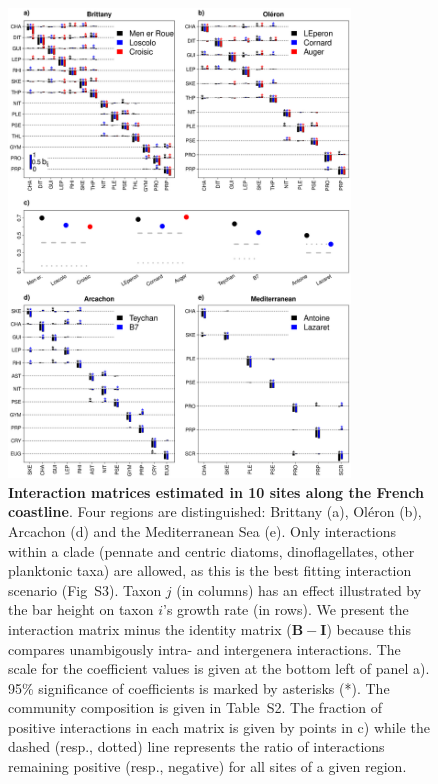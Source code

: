 \documentclass[10pt]{article}
\begin{document}
\begin{figure}[!ht]
\centering %
 \includegraphics[width=0.81\textwidth]{biotic_interaction_matrices_MainFig_allin1_v4}
\caption{\textbf{Interaction matrices estimated in 10 sites along the French
coastline}. Four regions are distinguished: Brittany (a), Oléron (b),
Arcachon (d) and the Mediterranean Sea (e). Only interactions within
a clade (pennate and centric diatoms, dinoflagellates, other planktonic
taxa) are allowed, as this is the best fitting interaction scenario
(Fig~S3). Taxon $j$ (in columns) has an effect illustrated by the
bar height on taxon $i$'s growth rate (in rows). We present the interaction
matrix minus the identity matrix ($\mathbf{B}-\mathbf{I}$) because
this compares unambigously intra- and intergenera interactions. The
scale for the coefficient values is given at the bottom left of panel
a). 95\% significance of coefficients is marked by asterisks ({*}).
The community composition is given in Table~S2. The fraction of positive
interactions in each matrix is given by points in c) while the dashed
(resp., dotted) line represents the ratio of interactions remaining
positive (resp., negative) for all sites of a given region.}
\label{fig:Interaction-matrices} 
\end{figure}
\end{document}
